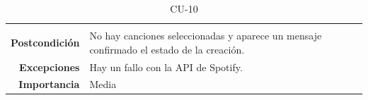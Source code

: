 \begin{table}[H]
\begin{tabular}{r|p{}}
\begin{itemize}
                                \end{itemize}\\
                                                                              
    \textbf{Postcondición} & No hay canciones seleccionadas y aparece un mensaje confirmado el estado de la creación. \\
    \textbf{Excepciones}   & Hay un fallo con la API de Spotify.                                                 \\
    \textbf{Importancia}   & Media                                                    \\ \hline
    \end{tabular}
    \caption{CU-10}
    \label{tab:CUT-10}
\end{table}




